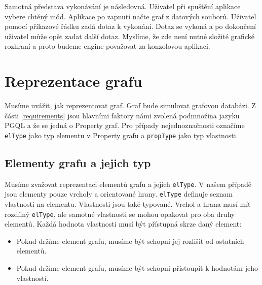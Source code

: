 Samotná představa vykonávání je následovná.
Uživatel při spuštění aplikace vybere chtěný mód.
Aplikace po zapnutí načte graf z datových souborů.
Uživatel pomocí příkazové řádku zadá dotaz k vykonání.
Dotaz se vykoná a po dokončení uživatel může opět zadat další dotaz.
Myslíme, že zde není nutné složité grafické rozhraní a proto budeme engine považovat za konzolovou aplikaci. 

\section{Reprezentace grafu} \label{anal.grafrep}

Musíme uvážit, jak reprezentovat graf.
Graf bude simulovat grafovou databázi.
Z části \ref{requirements} jsou hlavními faktory námi zvolená podmnožina jazyku PGQL a že se jedná o Property graf.
Pro případy nejednoznačnosti označíme \verb+elType+ jako typ elementu v Property grafu a \verb+propType+ jako typ vlastnosti.

\subsection{Elementy grafu a jejich typ}

Musíme zvažovat reprezentaci elementů grafu a jejich \verb+elType+.
V našem případě jsou elementy pouze vrcholy a orientované hrany.
\verb+elType+ definuje seznam vlastností na elementu. 
Vlastnosti jsou také typované.
Vrchol a hrana musí mít rozdílný \verb+elType+, ale samotné vlastnosti se mohou opakovat pro oba druhy elementů.
Každá hodnota vlastnosti musí být přístupná skrze daný element:

\begin{itemize}

\item Pokud držíme element grafu, musíme být schopni jej rozlišit od ostatních elementů.

\item Pokud držíme element grafu, musíme být schopni přistoupit k hodnotám jeho vlastností.

\end{itemize}

